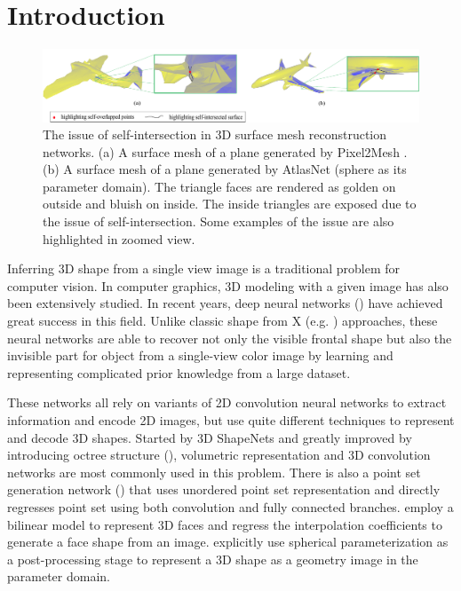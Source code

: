 \section{Introduction}
\begin{figure}[htbp]
	\centering
	\includegraphics[width=\linewidth]{img/issue/issue}
	\caption{The issue of self-intersection in 3D surface mesh reconstruction networks. (a) A surface mesh of a plane generated by Pixel2Mesh \cite{pixel2mesh}. (b) A surface mesh of a plane generated by AtlasNet \cite{atlasnet}(sphere as its parameter domain). The triangle faces are rendered as golden on outside and bluish on inside. The inside triangles are exposed due to the issue of self-intersection. Some examples of the issue are also highlighted in zoomed view.}
	\label{fig:issue}
\end{figure}
Inferring 3D shape from a single view image is a traditional problem for computer vision. In computer graphics, 3D modeling with a given image has also been extensively studied. In recent years, deep neural networks (\cite{3DR2N2,PSGN,3Drender,imgrecon15,3dshapenet,endface,octreegen,surfnet,shapeprior}) have achieved great success in this field. Unlike classic shape from X (e.g. \cite{shapefromshading,shapefromtext1,shapefromtext2}) approaches, these neural networks are able to recover not only the visible frontal shape but also the invisible part for object from a single-view color image by learning and representing complicated prior knowledge from a large dataset. 

These networks all rely on variants of 2D convolution neural networks to extract information and encode 2D images, but use quite different techniques to represent and decode 3D shapes. Started by 3D ShapeNets \cite{3dshapenet} and greatly improved by introducing octree structure (\cite{octreegen}), volumetric representation and 3D convolution networks are most commonly used in this problem. There is also a point set generation network (\cite{PSGN}) that uses unordered point set representation and directly regresses point set using both convolution and fully connected branches. \cite{endface} employ a bilinear model to represent 3D faces and regress the interpolation coefficients to generate a face shape from an image. \cite{surfnet} explicitly use spherical parameterization as a post-processing stage to represent a 3D shape as a geometry image in the parameter domain. 

